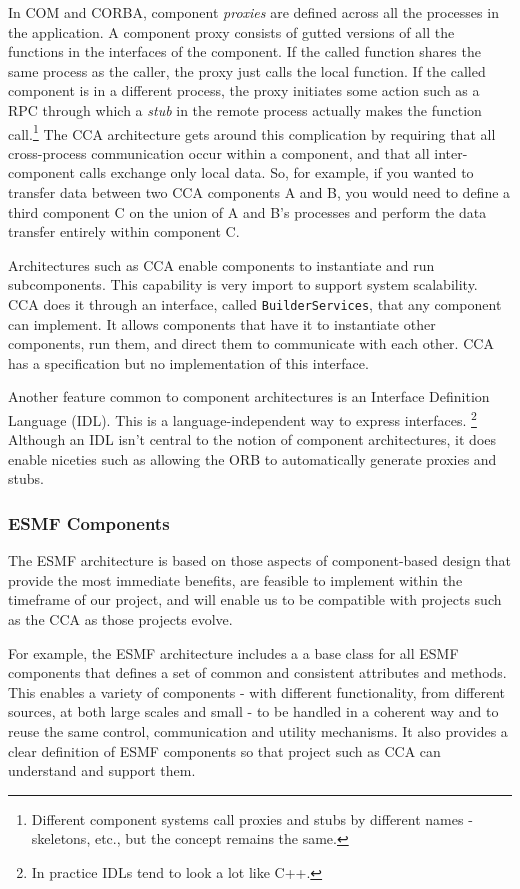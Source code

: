 In COM and CORBA, component {\it proxies} are defined across
all the processes in the application.  A component proxy consists of gutted 
versions of all the functions in the interfaces of the component.  If the 
called function shares the same process as the caller, the proxy just 
calls the local function.  If the called component is in a different process, 
the proxy initiates some action such as a RPC through which a {\it stub} in 
the remote process actually makes the function call.\footnote{Different 
component systems call proxies and 
stubs by different names - skeletons, etc., but the concept remains the same.}  
The CCA architecture gets around this complication by 
requiring that all cross-process communication occur within a component, and
that all inter-component calls exchange only local data.  So, for example,
if you wanted to transfer data between two CCA components A and B, you would need 
to define a third component C on the union of A and B's processes and perform
the data transfer entirely within component C.

Architectures such as CCA enable components to instantiate and run 
subcomponents.  This
capability is very import to support system scalability.  CCA does it 
through an interface, called {\tt BuilderServices}, that any component
can implement.  It allows components that have it to instantiate other
components, run them, and direct them to communicate with each other.
CCA has a specification but no implementation of this interface.

Another feature common to component architectures is an Interface Definition 
Language (IDL).  This is a language-independent way to express 
interfaces.  \footnote{In practice IDLs tend to look a lot like C++.}  
Although 
an IDL isn't central to the notion of component architectures, it does enable 
niceties such as allowing the ORB to automatically generate proxies and stubs.

\subsubsection{ESMF Components}

The ESMF architecture is based on those aspects of component-based design that
provide the most immediate benefits, are feasible to implement within the
timeframe of our project, and will enable us to be compatible with projects 
such as the CCA as those projects evolve.  

For example, the ESMF architecture includes a a base class for
all ESMF components that defines a set of common and consistent attributes
and methods.  This enables a variety of components - with different functionality, from different sources, at both large scales and small - to be handled
in a coherent way and to reuse the same control, communication and utility
mechanisms.  It also provides a clear definition of ESMF components so that
project such as CCA can understand and support them.  

